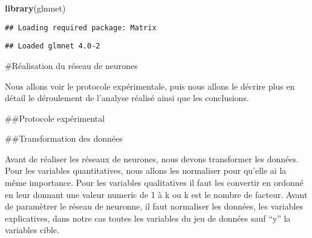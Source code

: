 \documentclass[
]{article}
\newenvironment{Shaded}{\begin{snugshade}}{\end{snugshade}}
\newcommand{\CommentTok}[1]{\textcolor[rgb]{0.56,0.35,0.01}{\textit{#1}}}
\newcommand{\DecValTok}[1]{\textcolor[rgb]{0.00,0.00,0.81}{#1}}
\newcommand{\KeywordTok}[1]{\textcolor[rgb]{0.13,0.29,0.53}{\textbf{#1}}}
\newcommand{\NormalTok}[1]{#1}
\newcommand{\OperatorTok}[1]{\textcolor[rgb]{0.81,0.36,0.00}{\textbf{#1}}}
\newcommand{\StringTok}[1]{\textcolor[rgb]{0.31,0.60,0.02}{#1}}
\begin{document}
\begin{Shaded}
\begin{Highlighting}[]
\KeywordTok{library}\NormalTok{(glmnet)}
\end{Highlighting}
\end{Shaded}

\begin{verbatim}
## Loading required package: Matrix
\end{verbatim}

\begin{verbatim}
## Loaded glmnet 4.0-2
\end{verbatim}

\begin{Shaded}
\end{Shaded}

\#Réalisation du réseau de neurones

Nous allons voir le protocole expérimentale, puis nous allons le décrire
plus en détail le déroulement de l'analyse réalisé ainsi que les
conclusions.

\#\#Protocole expérimental

\#\#Transformation des données

Avant de réaliser les réseaux de neurones, nous devons transformer les
données. Pour les variables quantitatives, nous allons les normaliser
pour qu'elle ai la même importance. Pour les variables qualitatives il
faut les convertir en ordonné en leur donnant une valeur numeric de 1 à
k ou k est le nombre de facteur. Avant de paramètrer le réseau de
neuronne, il faut normaliser les données, les variables explicatives,
dans notre cas toutes les variables du jeu de données sauf ``y'' la
variables cible.
\end{document}
